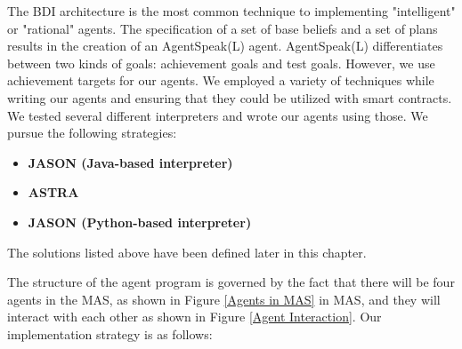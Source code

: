 \vspace{.5cm}

The \ac{BDI} architecture is the most common technique to implementing "intelligent" or "rational" agents. The specification of a set of base beliefs and a set of plans results in the creation of an AgentSpeak(L) agent. AgentSpeak(L) differentiates between two kinds of goals: achievement goals and test goals. However, we use achievement targets for our agents. We employed a variety of techniques while writing our agents and ensuring that they could be utilized with smart contracts. We tested several different interpreters and wrote our agents using those. We pursue the following strategies:

 \vspace{.5cm}
 
\begin{itemize}
    \item \textbf{JASON (Java-based interpreter)}
    
    \vspace{.5cm}
    
    \item \textbf{\ac{ASTRA}}
    
    \vspace{.5cm}
    
    \item \textbf{JASON (Python-based interpreter)}
    
     \vspace{.5cm}
\end{itemize}

The solutions listed above have been defined later in this chapter.

\vspace{.5cm }

The structure of the agent program is governed by the fact that there will be four agents in the \ac{MAS}, as shown in Figure \ref{Agents in MAS} in MAS, and they will interact with each other as shown in Figure \ref{Agent Interaction}. Our implementation strategy is as follows:

